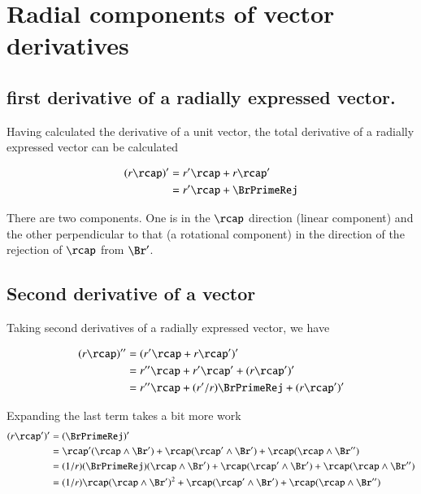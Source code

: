 \chapter{Radial components of vector derivatives}\label{chap:PJRadialDer}
\date{ Oct 22, 2007.  $RCSfile: radialVectorDerivatives.tex,v $ Last $Revision: 1.7 $ $Date: 2009/06/11 16:45:58 $ }

\section{first derivative of a radially expressed vector.}

Having calculated the derivative of a unit vector, the total 
derivative of a radially expressed vector can be calculated

\begin{align*}
(r\rcap)'  
   &= r'\rcap  + r\rcap' \\
   &= r'\rcap  + \BrPrimeRej \\
\end{align*}

There are two components.  One is in the $\rcap$ direction (linear component)
and the other perpendicular to that (a rotational component) in the direction of the rejection
of $\rcap$ from $\Br'$.

\section{Second derivative of a vector}

Taking second derivatives of a radially expressed vector, we have

\begin{align*}
(r\rcap)'' 
   &= (r'\rcap + r{\rcap}')' \\
   &= r''\rcap + r'\rcap' + (r\rcap')' \\
   &= r''\rcap + (r'/r)\BrPrimeRej + (r\rcap')' \\
\end{align*}

Expanding the last term takes a bit more work
\begin{align*}
(r\rcap')' 
   &= (\BrPrimeRej)' \\
   &= 
\rcap'(\rcap \wedge \Br') +
\rcap(\rcap' \wedge \Br') +
\rcap(\rcap \wedge \Br'') \\
   &= 
(1/r)(\BrPrimeRej)(\rcap \wedge \Br') +
\rcap(\rcap' \wedge \Br') +
\rcap(\rcap \wedge \Br'') \\
   &= 
(1/r)\rcap(\rcap \wedge \Br')^2 +
\rcap(\rcap' \wedge \Br') +
\rcap(\rcap \wedge \Br'') \\
\end{align*}

